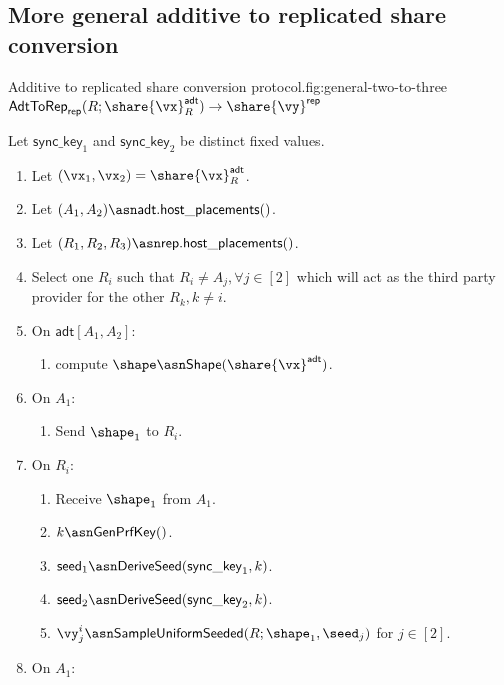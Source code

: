 \subsection{More general additive to replicated share conversion}


\begin{Boxfig}{Additive to replicated share conversion
protocol.}{fig:general-two-to-three}{$\mathsf{AdtToRep}_\mathsf{rep}(R;
\share{\vx}^{\mathsf{adt}}_{R}) \rightarrow \share{\vy}^\mathsf{rep}$}

Let $\mathsf{sync\_key}_1$ and $\mathsf{sync\_key}_2$ be distinct fixed values.
  
\begin{enumerate}
\item Let $(\vx_1, \vx_2) = \share{\vx}^{\mathsf{adt}}_{R}$.
\item Let $(A_1, A_2) \asn \mathsf{adt}.\mathsf{host\_placements()}$.
\item Let $(R_1, R_2, R_3) \asn \mathsf{rep}.\mathsf{host\_placements()}$.
\item Select one $R_i$ such that $R_i \neq A_j, \forall j \in [2]$ which will act as the third party provider for the other $R_k, k \neq i$.
\item On $\mathsf{adt}[A_1, A_2]$:
\begin{enumerate}
    \item compute $\shape \asn \mathsf{Shape}(\share{\vx}^{\mathsf{adt}})$.
\end{enumerate}
\item On $A_1$:
\begin{enumerate}
    \item Send $\shape_1$ to $R_i$.
\end{enumerate}
\item On $R_i$:
\begin{enumerate}
    \item Receive $\shape_1$ from $A_1$.
    \item $k \asn \mathsf{GenPrfKey}()$.
    \item $\mathsf{seed}_1 \asn \mathsf{DeriveSeed}(\mathsf{sync\_key}_1, k)$.
    \item $\mathsf{seed}_2 \asn \mathsf{DeriveSeed}(\mathsf{sync\_key}_2, k)$.
    \item $\vy_j^i \asn \mathsf{SampleUniformSeeded}(R; \shape_1, \seed_j)$ for $j \in [2]$.
\end{enumerate}
\item On $A_1$:
\begin{enumerate}

\end{enumerate}
\end{enumerate}
\end{Boxfig}
